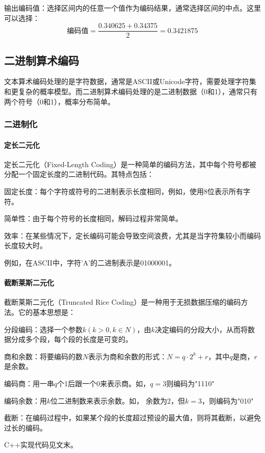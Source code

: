 \documentclass{/home/hi/Study/template/code}
\begin{document}
\begin{tcolorbox}
\begin{serialNumber}
		\item 输出编码值：选择区间内的任意一个值作为编码结果，通常选择区间的中点。这里可以选择：
		\begin{equation}
			\text{编码值} = \frac{0.340625 + 0.34375}{2} = 0.3421875
		\end{equation}
	\end{serialNumber}
\end{tcolorbox}


\subsection{二进制算术编码}
文本算术编码处理的是字符数据，通常是ASCII或Unicode字符，需要处理字符集和更复杂的概率模型。而二进制算术编码处理的是二进制数据（0和1），通常只有两个符号（0和1），概率分布简单。

\subsubsection{二进制化}
\paragraph{定长二元化}
定长二元化（Fixed-Length Coding）是一种简单的编码方法，其中每个符号都被分配一个固定长度的二进制代码。其特点包括：

固定长度：每个字符或符号的二进制表示长度相同，例如，使用8位表示所有字符。

简单性：由于每个符号的长度相同，解码过程非常简单。

效率：在某些情况下，定长编码可能会导致空间浪费，尤其是当字符集较小而编码长度较大时。

例如，在ASCII中，字符'A'的二进制表示是01000001。


\paragraph{截断莱斯二元化}
截断莱斯二元化（Truncated Rice Coding）是一种用于无损数据压缩的编码方法。它的基本思想是：
\begin{serialNumber}
	\item 分段编码：选择一个参数$k ( k > 0 , k \in N )$，由$k$决定编码的分段大小，从而将数据分成多个段，每个段的长度是可变的。
	\item 商和余数：将要编码的数$ N $表示为商和余数的形式：\( N = q \cdot 2^k + r \)，其中\( q \)是商，\( r \)是余数。
	\item 编码商：用一串\( q \)个1后跟一个0来表示商。如，$q = 3$则编码为"1110"
	\item 编码余数：用\( k \)位二进制数来表示余数。如， 余数为2，但$k = 3$，则编码为"010"
	\item 截断：在编码过程中，如果某个段的长度超过预设的最大值，则将其截断，以避免过长的编码。
\end{serialNumber}
C++实现代码见文末。
\end{document}
